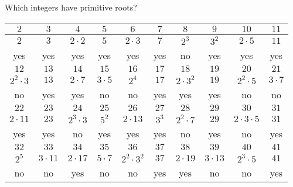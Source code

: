 \documentclass[handout]{beamer}
\begin{document}
\begin{frame}{Which integers have primitive roots?}
\begin{adjustwidth}{-2em}{-2em}
\small
\begin{tabular}{|c|c|c|c|c|c|c|c|c|c|}\hline
$2$           &  $3$         & $4$           &   $5$         & $6$            & $7$   & $8$          & $9$         & $10$            & $11$       \\ \hline
$2$           &  $3$         & $2\cdot2$     &   $5$         & $2\cdot3$      & $7$   & $2^3$        & $3^2$       & $2\cdot 5$      & $11$       \\ \hline
yes           &  yes         &  yes          &   yes         & yes            & yes   & no           & yes         & yes             & yes        \\ \hline\hline
$12$          &  $13$        & $14$          &   $15$        & $16$           & $17$  & $18$         & $19$        & $20$            & $21$       \\ \hline
$2^2\cdot3$   &  $13$        & $2\cdot7$     &   $3\cdot 5$  & $2^4$          & $17$  & $2\cdot 3^2$ & $19$        & $2^2\cdot 5$    & $3\cdot 7$ \\ \hline
no            &  yes         &  yes          &   no          & no             & yes   & yes          & yes         & no              & no         \\ \hline\hline
$22$          &  $23$        & $24$          &   $25$        & $26$           & $27$  & $28$         & $29$        & $30$            & $31$       \\ \hline
$2\cdot11$    &  $23$        & $2^3\cdot 3$  &   $5^2$       & $2\cdot 13$    & $3^3$ & $2^2\cdot 7$ & $29$        & $2\cdot3\cdot5$ & $31$       \\ \hline
yes           &  yes         &  no           &   yes         & yes            & yes   & no           & yes         & no              & yes        \\ \hline\hline
$32$          &  $33$        & $34$          &   $35$        & $36$           & $37$  & $38$         & $39$        & $40$            & $41$       \\ \hline
$2^5$         &  $3\cdot 11$ & $2\cdot 17$   &   $5\cdot 7$  & $2^2\cdot 3^2$ & $37$  & $2\cdot 19$  & $3\cdot 13$ & $2^3\cdot 5$    & $41$       \\ \hline
no            &  no          &  yes          &   no          & no             & yes   & yes          & no          & no              & yes        \\ \hline
\end{tabular}
\normalsize
\end{adjustwidth}

\end{frame}
\end{document}
